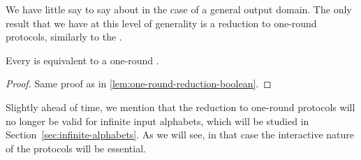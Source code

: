 



We have little say to say about  in the case of a general output
domain. The  only result that we have at this level of generality is a
reduction to one-round protocols, similarly to the .

\begin{lemma}
\label{lemma:one-round-reduction-general}
  Every  is equivalent to a one-round .
\end{lemma}
\begin{proof}
  Same proof as in \cref{lem:one-round-reduction-boolean}. 
\end{proof}

Slightly ahead of time, we mention that the reduction to one-round protocols will no longer be valid for infinite input alphabets, which will be studied in Section~\ref{sec:infinite-alphabets}. As we will see, in that case  the interactive nature of the protocols
will be essential.
